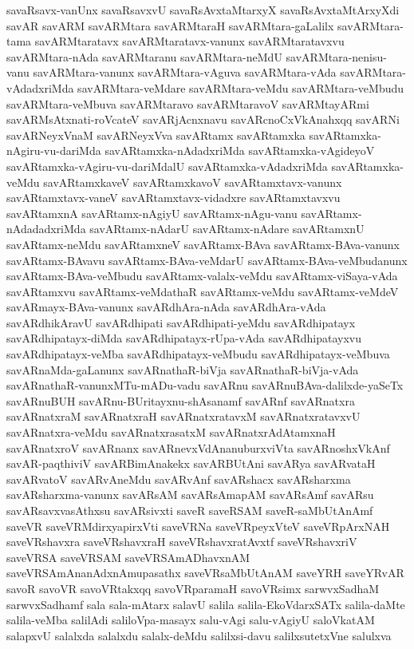 {savaRsavx-vanUnx
savaRsavxvU
savaRsAvxtaMtarxyX
savaRsAvxtaMtArxyXdi
savAR
savARM
savARMtara
savARMtaraH
savARMtara-gaLalilx
savARMtara-tama
savARMtaratavx
savARMtaratavx-vanunx
savARMtaratavxvu
savARMtara-nAda
savARMtaranu
savARMtara-neMdU
savARMtara-nenisu-vanu
savARMtara-vanunx
savARMtara-vAguva
savARMtara-vAda
savARMtara-vAdadxriMda
savARMtara-veMdare
savARMtara-veMdu
savARMtara-veMbudu
savARMtara-veMbuva
savARMtaravo
savARMtaravoV
savARMtayARmi
savARMsAtxnati-roVcateV
savARjAcnxnavu
savARcnoCxVkAnahxqq
savARNi
savARNeyxVnaM
savARNeyxVva
savARtamx
savARtamxka
savARtamxka-nAgiru-vu-dariMda
savARtamxka-nAdadxriMda
savARtamxka-vAgideyoV
savARtamxka-vAgiru-vu-dariMdalU
savARtamxka-vAdadxriMda
savARtamxka-veMdu
savARtamxkaveV
savARtamxkavoV
savARtamxtavx-vanunx
savARtamxtavx-vaneV
savARtamxtavx-vidadxre
savARtamxtavxvu
savARtamxnA
savARtamx-nAgiyU
savARtamx-nAgu-vanu
savARtamx-nAdadadxriMda
savARtamx-nAdarU
savARtamx-nAdare
savARtamxnU
savARtamx-neMdu
savARtamxneV
savARtamx-BAva
savARtamx-BAva-vanunx
savARtamx-BAvavu
savARtamx-BAva-veMdarU
savARtamx-BAva-veMbudanunx
savARtamx-BAva-veMbudu
savARtamx-valalx-veMdu
savARtamx-viSaya-vAda
savARtamxvu
savARtamx-veMdathaR
savARtamx-veMdu
savARtamx-veMdeV
savARmayx-BAva-vanunx
savARdhAra-nAda
savARdhAra-vAda
savARdhikAravU
savARdhipati
savARdhipati-yeMdu
savARdhipatayx
savARdhipatayx-diMda
savARdhipatayx-rUpa-vAda
savARdhipatayxvu
savARdhipatayx-veMba
savARdhipatayx-veMbudu
savARdhipatayx-veMbuva
savARnaMda-gaLanunx
savARnathaR-biVja
savARnathaR-biVja-vAda
savARnathaR-vanunxMTu-mADu-vadu
savARnu
savARnuBAva-dalilxde-yaSeTx
savARnuBUH
savARnu-BUritayxnu-shAsanamf
savARnf
savARnatxra
savARnatxraM
savARnatxraH
savARnatxratavxM
savARnatxratavxvU
savARnatxra-veMdu
savARnatxrasatxM
savARnatxrAdAtamxnaH
savARnatxroV
savARnanx
savARnevxVdAnanuburxviVta
savARnoshxVkAnf
savAR-paqthiviV
savARBimAnakekx
savARBUtAni
savARya
savARvataH
savARvatoV
savARvAneMdu
savARvAnf
savARshacx
savARsharxma
savARsharxma-vanunx
savARsAM
savARsAmapAM
savARsAmf
savARsu
savARsavxvasAthxsu
savARsivxti
saveR
saveRSAM
saveR-saMbUtAnAmf
saveVR
saveVRMdirxyapirxVti
saveVRNa
saveVRpeyxVteV
saveVRpArxNAH
saveVRshavxra
saveVRshavxraH
saveVRshavxratAvxtf
saveVRshavxriV
saveVRSA
saveVRSAM
saveVRSAmADhavxnAM
saveVRSAmAnanAdxnAmupasathx
saveVRsaMbUtAnAM
saveYRH
saveYRvAR
savoR
savoVR
savoVRtakxqq
savoVRparamaH
savoVRsimx
sarwvxSadhaM
sarwvxSadhamf
sala
sala-mAtarx
salavU
salila
salila-EkoVdarxSATx
salila-daMte
salila-veMba
salilAdi
saliloVpa-masayx
salu-vAgi
salu-vAgiyU
saloVkatAM
salapxvU
salalxda
salalxdu
salalx-deMdu
salilxsi-davu
salilxsutetxVne
salulxva
}
